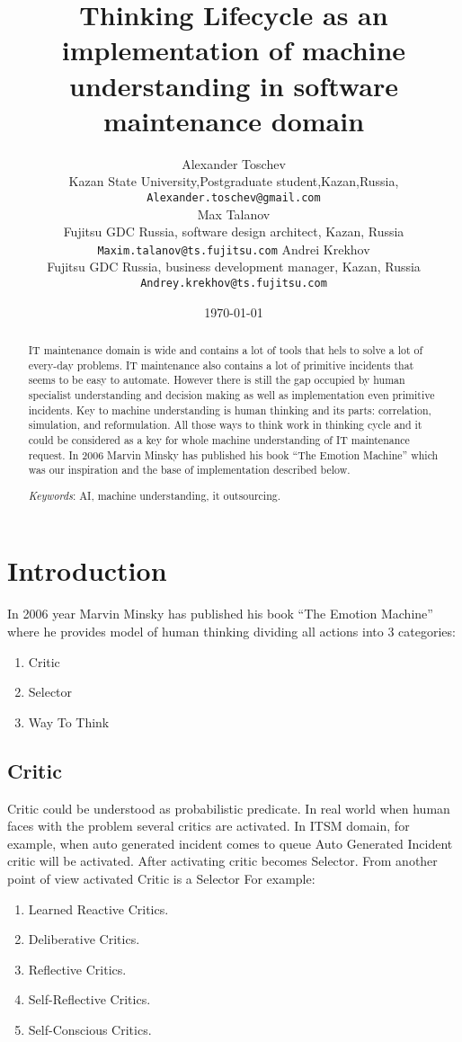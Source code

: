 \documentclass[12pt]{article}
\title{Thinking Lifecycle as an implementation of machine understanding in software maintenance domain}
\author{Alexander Toschev\\
Kazan State University,Postgraduate student,Kazan,Russia,\\
\texttt{Alexander.toschev@gmail.com}\\
Max Talanov\\Fujitsu GDC Russia, software design architect, Kazan, Russia\\
\texttt{Maxim.talanov@ts.fujitsu.com}
Andrei Krekhov\\
Fujitsu GDC Russia, business development manager, Kazan, Russia\\
\texttt{Andrey.krekhov@ts.fujitsu.com}
}
\date{\today}
\begin{document}
\maketitle

\begin{abstract}
IT maintenance domain is wide and contains a lot of tools that hels to solve a lot of every-day problems. IT maintenance also contains a lot of primitive incidents that seems to be easy to automate. However there is still the gap occupied by human specialist understanding and decision making as well as implementation even primitive incidents. Key to machine understanding is human thinking and its parts: correlation, simulation, and reformulation. All those ways to think work in thinking cycle and it could be considered as a key for whole machine understanding of IT maintenance request. In 2006 Marvin Minsky has published his book “The Emotion Machine” which was our inspiration and the base of implementation described below.

\emph{Keywords}: AI, machine understanding, it outsourcing.

\end{abstract}

\section{Introduction}
In 2006 year Marvin Minsky has published his book “The Emotion Machine” where he provides model of human thinking dividing all actions into 3 categories:

\begin{enumerate}
 \item Critic
 \item Selector
 \item Way To Think
\end{enumerate}

\subsection{Critic}
Critic could be understood as probabilistic predicate. In real world when human faces with the problem several critics are activated. In ITSM domain, for example, when auto generated incident comes to queue Auto Generated Incident critic will be activated. After activating critic becomes Selector. From another point of view activated Critic is a Selector
For example:

\begin{enumerate}
 \item Learned Reactive Critics.
 \item Deliberative Critics.
 \item Reflective Critics.
 \item Self-Reflective Critics.
 \item Self-Conscious Critics.
\end{enumerate}
\end{document}
